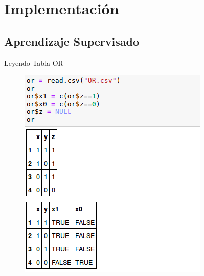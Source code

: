 \documentclass{beamer}
\begin{document}
\section{Implementación}
\subsection{Aprendizaje Supervisado}
\begin{frame}
\begin{block}{Leyendo Tabla OR}
\begin{figure}
\includegraphics[scale=0.4]{reador.png}
\centering
\end{figure}
\end{block}
\end{frame}
\end{document}
